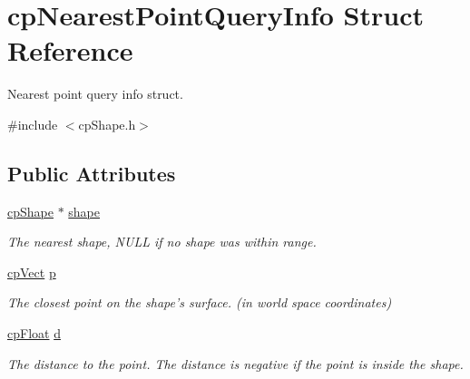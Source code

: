 \hypertarget{structcp_nearest_point_query_info}{\section{cp\-Nearest\-Point\-Query\-Info Struct Reference}
\label{structcp_nearest_point_query_info}
}


Nearest point query info struct.  




{\ttfamily \#include $<$cp\-Shape.\-h$>$}

\subsection*{Public Attributes}
\begin{DoxyCompactItemize}
\item 
\hypertarget{structcp_nearest_point_query_info_a7a42e90795dad7175bff3c2bbcacc0c3}{\hyperlink{structcp_shape}{cp\-Shape} $\ast$ \hyperlink{structcp_nearest_point_query_info_a7a42e90795dad7175bff3c2bbcacc0c3}{shape}}\label{structcp_nearest_point_query_info_a7a42e90795dad7175bff3c2bbcacc0c3}

\begin{DoxyCompactList}\small\item\em The nearest shape, N\-U\-L\-L if no shape was within range. \end{DoxyCompactList}\item 
\hypertarget{structcp_nearest_point_query_info_ac067b9adebbcbe007b8f7c59c7f5202e}{\hyperlink{structcp_vect}{cp\-Vect} \hyperlink{structcp_nearest_point_query_info_ac067b9adebbcbe007b8f7c59c7f5202e}{p}}\label{structcp_nearest_point_query_info_ac067b9adebbcbe007b8f7c59c7f5202e}

\begin{DoxyCompactList}\small\item\em The closest point on the shape's surface. (in world space coordinates) \end{DoxyCompactList}\item 
\hypertarget{structcp_nearest_point_query_info_a7ac47ed7488eacb929a9ad72677f1f36}{\hyperlink{group__basic_types_gac1ed65573e035bf892505768c852d8d3}{cp\-Float} \hyperlink{structcp_nearest_point_query_info_a7ac47ed7488eacb929a9ad72677f1f36}{d}}\label{structcp_nearest_point_query_info_a7ac47ed7488eacb929a9ad72677f1f36}

\begin{DoxyCompactList}\small\item\em The distance to the point. The distance is negative if the point is inside the shape. \end{DoxyCompactList}\end{DoxyCompactItemize}


